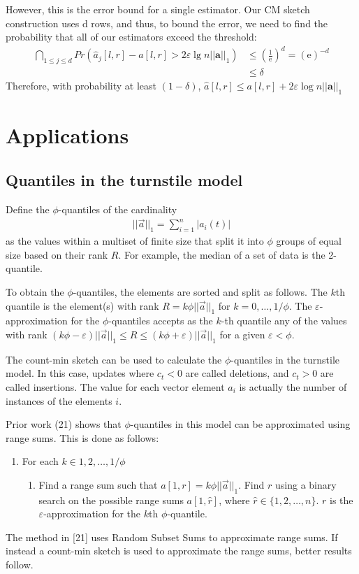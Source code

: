 \documentclass[11pt]{article}
\begin{document}
However, this is the error bound for a single estimator. Our CM sketch construction uses d rows, and thus, to bound the error, we need to find the probability that all of our estimators exceed the threshold:
\begin{align*}
    \bigcap_{1\leq j \leq d} Pr(\hat a_j[l,r] - a[l,r] > 2\varepsilon \lg n ||\bm{a}||_1) &\leq \left(\frac{1}{\mathrm e}\right)^d = (\mathrm e)^{-d}\\
    &\leq \delta
\end{align*}
Therefore, with probability at least $(1-\delta)$, $\hat a[l,r] \leq a[l,r] + 2\varepsilon \log n ||\bm{a}||_1$
\section{Applications}
\subsection{Quantiles in the turnstile model}
Define the $\phi$-quantiles of the cardinality
\begin{align}
    ||\vec{a}||_1 = \sum_{i = 1}^{n}|a_i(t)|
\end{align}
as the values within a multiset of finite size that split it into $\phi$ groups
of equal size based on their rank $R$.  For example, the median of a set of data
is the 2-quantile. 

To obtain the $\phi$-quantiles, the elements are sorted and split as follows.
The $k$th quantile is the element(s) with rank $R = k\phi||\vec{a}||_1$ for $k =
0, \dots, 1/\phi$.  The $\varepsilon$-approximation for the $\phi$-quantiles
accepts as the $k$-th quantile any of the  values with rank $(k\phi -
\varepsilon)||\vec{a}||_1 \leq R \leq (k\phi + \varepsilon)||\vec{a}||_1$ for a
given $\varepsilon < \phi$.


The count-min sketch can be used to calculate the $\phi$-quantiles in the turnstile model.
In this case, updates where $c_t < 0$ are called deletions, and $c_t > 0$ are called insertions.
The value for each vector element $a_i$ is actually the number of instances of the elements
$i$.

Prior work (21) shows that $\phi$-quantiles in this model can be approximated using range sums. This is done
as follows:
\begin{enumerate}
    \item For each $k \in {1, 2, \dots, 1/\phi}$
    \begin{enumerate}
        \item Find a range sum such that $a[1, r] = k\phi||\vec{a}||_1$. Find $r$ using a binary
        search on the possible range sums $a[1, \hat{r}]$, where $\hat{r} \in \{1, 2, \dots, n\}$.  $r$ is the
        $\varepsilon$-approximation for the $k$th $\phi$-quantile.
    \end{enumerate}
\end{enumerate}
The method in [21] uses Random Subset Sums to approximate range sums.  If instead a count-min
sketch is used to approximate the range sums, better results follow.  
\end{document}
